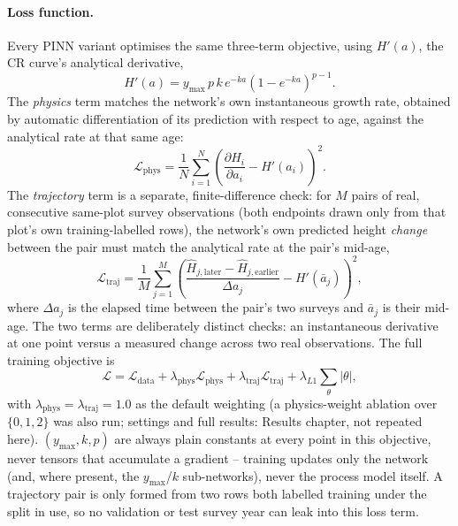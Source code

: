 \documentclass[11pt,a4paper]{report}
\begin{document}
\paragraph{Loss function.} Every PINN variant optimises the same three-term objective, using
$H'(a)$, the CR curve's analytical derivative,
\begin{equation}
H'(a) = y_{\max}\,p\,k\,e^{-ka}\left(1-e^{-ka}\right)^{p-1}.
\label{eq:cr-derivative}
\end{equation}
The \emph{physics} term matches the network's own instantaneous growth rate, obtained by automatic
differentiation of its prediction with respect to age, against the analytical rate at that same
age:
\begin{equation}
\mathcal{L}_{\text{phys}} = \frac{1}{N}\sum_{i=1}^{N}\left(\frac{\partial \hat H_i}{\partial a_i} -
H'(a_i)\right)^2.
\label{eq:physics-loss}
\end{equation}
The \emph{trajectory} term is a separate, finite-difference check: for $M$ pairs of real,
consecutive same-plot survey observations (both endpoints drawn only from that plot's own
training-labelled rows), the network's own predicted height \emph{change} between the pair must
match the analytical rate at the pair's mid-age,
\begin{equation}
\mathcal{L}_{\text{traj}} = \frac{1}{M}\sum_{j=1}^{M}\left(\frac{\hat H_{j,\text{later}} -
\hat H_{j,\text{earlier}}}{\Delta a_j} - H'(\bar a_j)\right)^2,
\label{eq:trajectory-loss}
\end{equation}
where $\Delta a_j$ is the elapsed time between the pair's two surveys and $\bar a_j$ is their
mid-age. The two terms are deliberately distinct checks: an instantaneous derivative at one point
versus a measured change across two real observations. The full training objective is
\begin{equation}
\mathcal{L} = \mathcal{L}_{\text{data}} + \lambda_{\text{phys}}\mathcal{L}_{\text{phys}} +
\lambda_{\text{traj}}\mathcal{L}_{\text{traj}} + \lambda_{L1}\sum_{\theta}|\theta|,
\label{eq:total-loss}
\end{equation}
with $\lambda_{\text{phys}}=\lambda_{\text{traj}}=1.0$ as the default weighting (a physics-weight
ablation over $\{0,1,2\}$ was also run; settings and full results: Results chapter, not repeated
here). $(y_{\max},k,p)$ are always plain constants at every point in this objective, never
tensors that accumulate a gradient -- training updates only the network (and, where present, the
$y_{\max}$/$k$ sub-networks), never the process model itself. A trajectory pair is only formed
from two rows both labelled training under the split in use, so no validation or test survey year
can leak into this loss term.
\end{document}
